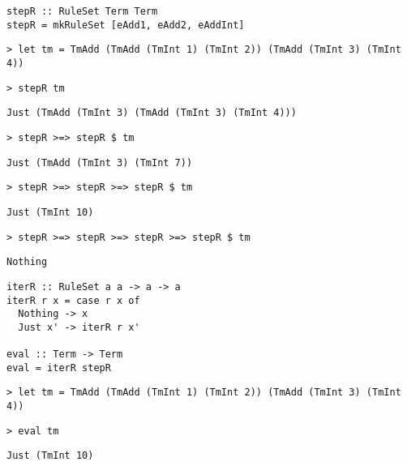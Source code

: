 \begin{frame}[fragile]
  \begin{verbatim}
stepR :: RuleSet Term Term
stepR = mkRuleSet [eAdd1, eAdd2, eAddInt]
  \end{verbatim}
\end{frame}

\begin{frame}[fragile]
  \onslide<+->
  \begin{verbatim}
> let tm = TmAdd (TmAdd (TmInt 1) (TmInt 2)) (TmAdd (TmInt 3) (TmInt 4))
  \end{verbatim}
  \onslide<+->
  \begin{verbatim}
> stepR tm
  \end{verbatim}
  \onslide<+->
  \begin{verbatim}
Just (TmAdd (TmInt 3) (TmAdd (TmInt 3) (TmInt 4)))
  \end{verbatim}
  \onslide<+->
  \begin{verbatim}
> stepR >=> stepR $ tm
  \end{verbatim}
  \onslide<+->
  \begin{verbatim}
Just (TmAdd (TmInt 3) (TmInt 7))
  \end{verbatim}
  \onslide<+->
  \begin{verbatim}
> stepR >=> stepR >=> stepR $ tm
  \end{verbatim}
  \onslide<+->
  \begin{verbatim}
Just (TmInt 10)
  \end{verbatim}
  \onslide<+->
  \begin{verbatim}
> stepR >=> stepR >=> stepR >=> stepR $ tm
  \end{verbatim}
  \onslide<+->
  \begin{verbatim}
Nothing
  \end{verbatim}
\end{frame}

\begin{frame}[fragile]
  \begin{verbatim}
iterR :: RuleSet a a -> a -> a
iterR r x = case r x of
  Nothing -> x
  Just x' -> iterR r x'

eval :: Term -> Term
eval = iterR stepR
  \end{verbatim}
\end{frame}

\begin{frame}[fragile]
  \onslide<+->
  \begin{verbatim}
> let tm = TmAdd (TmAdd (TmInt 1) (TmInt 2)) (TmAdd (TmInt 3) (TmInt 4))
  \end{verbatim}
  \onslide<+->
  \begin{verbatim}
> eval tm
  \end{verbatim}
  \onslide<+->
  \begin{verbatim}
Just (TmInt 10)
  \end{verbatim}
\end{frame}
